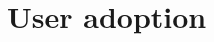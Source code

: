 \documentclass[11pt]{article}
\newcommand{\smalltodo}[2][]
    {\todo[caption={#2}, #1]
    {\tiny#2\normalsize}}
\begin{document}
%





\section{User adoption}

\end{document}
